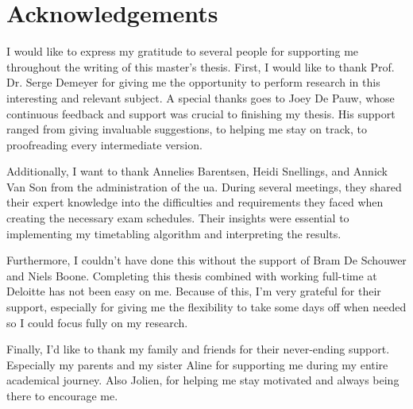 
\section*{Acknowledgements}

I would like to express my gratitude to several people for supporting me throughout the writing of this master's thesis. First, I would like to thank Prof. Dr. Serge Demeyer for giving me the opportunity to perform research in this interesting and relevant subject. A special thanks goes to Joey De Pauw, whose continuous feedback and support was crucial to finishing my thesis. His support ranged from giving invaluable suggestions, to helping me stay on track, to proofreading every intermediate version. 

Additionally, I want to thank Annelies Barentsen, Heidi Snellings, and Annick Van Son from the administration of the \acrlong{ua}. During several meetings, they shared their expert knowledge into the difficulties and requirements they faced when creating the necessary exam schedules. Their insights were essential to implementing my timetabling algorithm and interpreting the results.

Furthermore, I couldn't have done this without the support of Bram De Schouwer and Niels Boone. Completing this thesis combined with working full-time at Deloitte has not been easy on me. Because of this, I'm very grateful for their support, especially for giving me the flexibility to take some days off when needed so I could focus fully on my research. 

Finally, I'd like to thank my family and friends for their never-ending support. Especially my parents and my sister Aline for supporting me during my entire academical journey. Also Jolien, for helping me stay motivated and always being there to encourage me.
